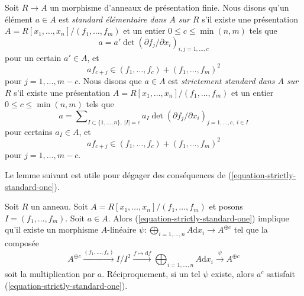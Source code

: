 \begin{definition}
\label{definition-strictly-standard}
Soit $R \to A$ un morphisme d'anneaux de présentation finie.
Nous disons qu'un élément $a \in A$ est {\it standard élémentaire dans $A$ sur $R$}
s'il existe une présentation
$A = R[x_1, \ldots, x_n]/(f_1, \ldots, f_m)$
et un entier $0 \leq c \leq \min(n, m)$ tels que
\begin{equation}
\label{equation-elementary-standard-one}
a = a' \det(\partial f_j/\partial x_i)_{i, j = 1, \ldots, c}
\end{equation}
pour un certain $a' \in A$, et
\begin{equation}
\label{equation-elementary-standard-two}
a f_{c + j} \in (f_1, \ldots, f_c) + (f_1, \ldots, f_m)^2
\end{equation}
pour $j = 1, \ldots, m - c$. Nous disons que $a \in A$ est
{\it strictement standard dans $A$ sur $R$} s'il existe une présentation
$A = R[x_1, \ldots, x_n]/(f_1, \ldots, f_m)$
et un entier $0 \leq c \leq \min(n, m)$ tels que
\begin{equation}
\label{equation-strictly-standard-one}
a = \sum\nolimits_{I \subset \{1, \ldots, n\},\ |I| = c}
a_I \det(\partial f_j/\partial x_i)_{j = 1, \ldots, c,\ i \in I}
\end{equation}
pour certains $a_I \in A$, et
\begin{equation}
\label{equation-strictly-standard-two}
a f_{c + j} \in (f_1, \ldots, f_c) + (f_1, \ldots, f_m)^2
\end{equation}
pour $j = 1, \ldots, m - c$.
\end{definition}

\noindent
Le lemme suivant est utile pour dégager des conséquences de
(\ref{equation-strictly-standard-one}).

\begin{lemma}
\label{lemma-parse-equation-strictly-standard-one}
Soit $R$ un anneau. Soit $A = R[x_1, \ldots, x_n]/(f_1, \ldots, f_m)$
et posons $I = (f_1, \ldots, f_m)$. Soit $a \in A$. Alors
(\ref{equation-strictly-standard-one}) implique qu'il existe un morphisme
$A$-linéaire
$\psi : \bigoplus\nolimits_{i = 1, \ldots, n} A \text{d}x_i \to A^{\oplus c}$
tel que la composée
$$
A^{\oplus c} \xrightarrow{(f_1, \ldots, f_c)}
I/I^2 \xrightarrow{f \mapsto \text{d}f}
\bigoplus\nolimits_{i = 1, \ldots, n} A \text{d}x_i
\xrightarrow{\psi}
A^{\oplus c}
$$
soit la multiplication par $a$. Réciproquement, si un tel $\psi$ existe,
alors $a^c$ satisfait (\ref{equation-strictly-standard-one}).
\end{lemma}

